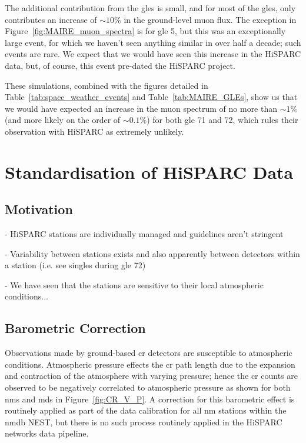 The additional contribution from the \glspl{gle} is small, and for most of the \glspl{gle}, only contributes an increase of $\sim 10 \%$ in the ground-level muon flux. The exception in Figure~\ref{fig:MAIRE_muon_spectra} is for \gls{gle} 5, but this was an exceptionally large event, for which we haven't seen anything similar in over half a decade; such events are rare. We expect that we would have seen this increase in the HiSPARC data, but, of course, this event pre-dated the HiSPARC project.

These simulations, combined with the figures detailed in Table~\ref{tab:space_weather_events} and Table~\ref{tab:MAIRE_GLEs}, show us that we would have expected an increase in the muon spectrum of no more than $\sim 1\%$ (and more likely on the order of $\sim 0.1\%$) for both \gls{gle} 71 and 72, which rules their observation with HiSPARC as extremely unlikely.




\section{Standardisation of HiSPARC Data}\label{sec:HS_standardisation}

\subsection{Motivation}
- HiSPARC stations are individually managed and guidelines aren't stringent

- Variability between stations exists and also apparently between detectors within a station (i.e. see singles during \gls{gle} 72)

- We have seen that the stations are sensitive to their local atmospheric conditions...

\subsection{Barometric Correction}\label{sec:HS_P_corr}

Observations made by ground-based \gls{cr} detectors are susceptible to atmospheric conditions. Atmospheric pressure effects the \gls{cr} path length due to the expansion and contraction of the atmosphere with varying pressure; hence the \gls{cr} counts are observed to be negatively correlated to atmospheric pressure as shown for both \glspl{nm} and \glspl{md} in Figure~\ref{fig:CR_V_P}. A correction for this barometric effect is routinely applied as part of the data calibration for all \gls{nm} stations within the \gls{nmdb} NEST, but there is no such process routinely applied in the HiSPARC networks data pipeline.


